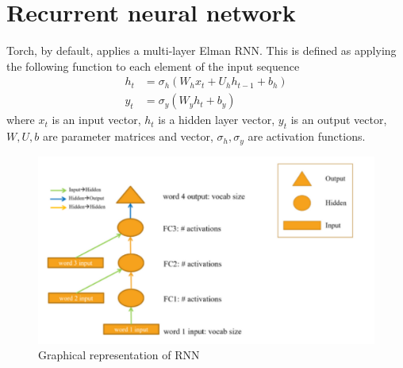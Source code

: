 \documentclass[11pt]{article}
\numberwithin{equation}{section}
\begin{document}
\section{Recurrent neural network}
Torch, by default, applies a multi-layer Elman RNN. This is defined as applying the following function to each element of the input sequence
\begin{align}
h_t  &= \sigma_h(W_h x_t + U_h h_{t-1} + b_h)\\
y_t  &= \sigma_y(W_y h_t + b_y)
\end{align}
where $x_t$ is an input vector, $h_t$ is a hidden layer vector, $y_t$ is an output vector, $W, U, b$ are parameter matrices and vector, $\sigma_h, \sigma_y$ are activation functions.

\begin{figure}
\begin{center}
\includegraphics[width=0.8\columnwidth]{figures/rnn.png}  
\end{center}
\caption{Graphical representation of RNN
}
\label{fig:rnn}
\end{figure}

\cite{bahdanau14}


\newpage
 
\end{document}
